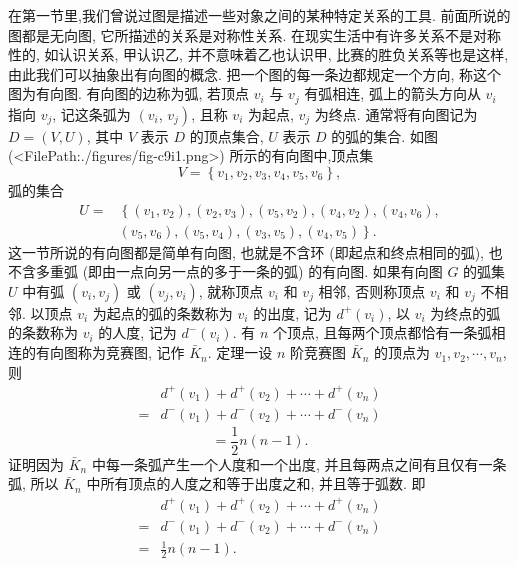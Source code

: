 
在第一节里,我们曾说过图是描述一些对象之间的某种特定关系的工具.
前面所说的图都是无向图, 它所描述的关系是对称性关系.
在现实生活中有许多关系不是对称性的, 如认识关系, 甲认识乙, 并不意味着乙也认识甲, 比赛的胜负关系等也是这样, 由此我们可以抽象出有向图的概念.
把一个图的每一条边都规定一个方向, 称这个图为有向图.
有向图的边称为弧, 若顶点 $v_i$ 与 $v_j$ 有弧相连, 弧上的箭头方向从 $v_i$ 指向 $v_j$, 记这条弧为 $\left(v_i\right.$, $\left.v_j\right)$, 且称 $v_i$ 为起点, $v_j$ 为终点.
通常将有向图记为 $D=(V, U)$, 其中 $V$ 表示 $D$ 的顶点集合, $U$ 表示 $D$ 的弧的集合.
如图(<FilePath:./figures/fig-c9i1.png>) 所示的有向图中,顶点集
$$
V=\left\{v_1, v_2, v_3, v_4, v_5, v_6\right\},
$$
弧的集合
$$
\begin{aligned}
U= & \left\{\left(v_1, v_2\right),\left(v_2, v_3\right),\left(v_5, v_2\right),\left(v_4, v_2\right),\left(v_4, v_6\right),\right. \\
& \left.\left(v_5, v_6\right),\left(v_5, v_4\right),\left(v_3, v_5\right),\left(v_4, v_5\right)\right\} .
\end{aligned}
$$
这一节所说的有向图都是简单有向图, 也就是不含环 (即起点和终点相同的弧), 也不含多重弧 (即由一点向另一点的多于一条的弧) 的有向图.
如果有向图 $G$ 的弧集 $U$ 中有弧 $\left(v_i, v_j\right)$ 或 $\left(v_j, v_i\right)$, 就称顶点 $v_i$ 和 $v_j$ 相邻, 否则称顶点 $v_i$ 和 $v_j$ 不相邻.
以顶点 $v_i$ 为起点的弧的条数称为 $v_i$ 的出度, 记为 $d^{+}\left(v_i\right)$, 以 $v_i$ 为终点的弧的条数称为 $v_i$ 的人度, 记为 $d^{-}\left(v_i\right)$.
有 $n$ 个顶点, 且每两个顶点都恰有一条弧相连的有向图称为竞赛图, 记作 $\bar{K}_n$.
定理一设 $n$ 阶竞赛图 $\bar{K}_n$ 的顶点为 $v_1, v_2, \cdots, v_n$, 则
$$
\begin{aligned}
& d^{+}\left(v_1\right)+d^{+}\left(v_2\right)+\cdots+d^{+}\left(v_n\right) \\
= & d^{-}\left(v_1\right)+d^{-}\left(v_2\right)+\cdots+d^{-}\left(v_n\right)
\end{aligned}
$$
$$
=\frac{1}{2} n(n-1) .
$$
证明因为 $\bar{K}_n$ 中每一条弧产生一个人度和一个出度, 并且每两点之间有且仅有一条弧, 所以 $\bar{K}_n$ 中所有顶点的人度之和等于出度之和, 并且等于弧数.
即
$$
\begin{aligned}
& d^{+}\left(v_1\right)+d^{+}\left(v_2\right)+\cdots+d^{+}\left(v_n\right) \\
= & d^{-}\left(v_1\right)+d^{-}\left(v_2\right)+\cdots+d^{-}\left(v_n\right) \\
= & \frac{1}{2} n(n-1) .
\end{aligned}
$$



